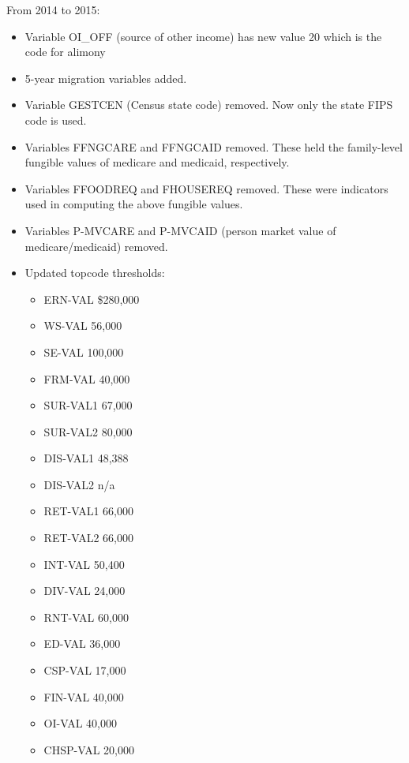 \documentclass{article}
\begin{document}
From 2014 to 2015:
\begin{itemize}
	\item Variable OI\_OFF (source of other income) has new value 20 which is the code for alimony
	\item 5-year migration variables added.
	\item Variable GESTCEN (Census state code) removed. Now only the state FIPS code is used.
	\item Variables FFNGCARE and FFNGCAID removed. These held the family-level fungible values of medicare and medicaid, respectively.
	\item Variables FFOODREQ and FHOUSEREQ removed. These were indicators used in computing the above fungible values. 
	\item Variables P-MVCARE and P-MVCAID (person market value of medicare/medicaid) removed.
	\item Updated topcode thresholds:
	\begin{itemize}
		\item ERN-VAL \$280,000
		\item WS-VAL	56,000 
		\item SE-VAL 100,000
		\item FRM-VAL 40,000  
		\item SUR-VAL1 67,000
		\item SUR-VAL2 80,000 
		\item DIS-VAL1 48,388
		\item DIS-VAL2  n/a
		\item RET-VAL1 66,000
		\item RET-VAL2 66,000
		\item INT-VAL 50,400
		\item DIV-VAL 24,000
		\item RNT-VAL 60,000
		\item ED-VAL 36,000
		\item CSP-VAL 17,000
		\item FIN-VAL 40,000
		\item OI-VAL 40,000
		\item CHSP-VAL 20,000
	\end{itemize}
\end{itemize}
\end{document}
